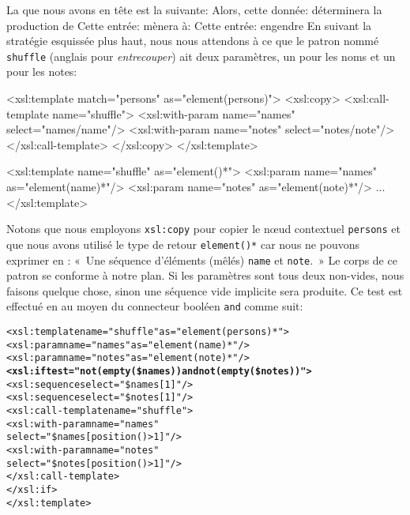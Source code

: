 La \DTD que nous avons en tête est la suivante:
\noindent Alors, cette donnée:
\noindent déterminera la production de
\noindent Cette entrée:
\noindent mènera à:
\noindent Cette entrée:
\noindent engendre
En suivant la stratégie esquissée plus haut, nous nous attendons à ce
que le patron nommé \texttt{shuffle} (anglais pour \emph{entrecouper})
ait deux paramètres, un pour les noms et un pour les notes:
\begin{sverb}
  <xsl:template match="persons" as="element(persons)">
    <xsl:copy>
      <xsl:call-template name="shuffle">
        <xsl:with-param name="names" select="names/name"/>
        <xsl:with-param name="notes" select="notes/note"/>
      </xsl:call-template>
    </xsl:copy>
  </xsl:template>

  <xsl:template name="shuffle" as="element()*">
    <xsl:param name="names" as="element(name)*"/>
    <xsl:param name="notes" as="element(note)*"/>
    ...
  </xsl:template>
\end{sverb}
Notons que nous employons \texttt{xsl:copy} pour copier le n{\oe}ud
contextuel \texttt{persons} et que nous avons utilisé le type de
retour \texttt{element()*} car nous ne pouvons exprimer en \XPath:
«~Une séquence d'éléments (mêlés) \texttt{name} et \texttt{note}.~» Le
corps de ce patron se conforme à notre plan. Si les paramètres sont
tous deux non-vides, nous faisons quelque chose, sinon une séquence
vide implicite sera produite. Ce test est effectué en \XPath au moyen
du connecteur booléen \texttt{and} comme suit:
\begin{alltt}
\small  <xsl:template name="shuffle" as="element(persons)*">
    <xsl:param name="names" as="element(name)*"/>
    <xsl:param name="notes" as="element(note)*"/>
    \textbf{<xsl:if test="not(empty(\$names)) and not(empty(\$notes))">}
      <xsl:sequence select="\$names[1]"/>
      <xsl:sequence select="\$notes[1]"/>
      <xsl:call-template name="shuffle">
        <xsl:with-param name="names"
                        select="\$names[position()>1]"/>
        <xsl:with-param name="notes"
                        select="\$notes[position()>1]"/>
      </xsl:call-template>
    </xsl:if>
  </xsl:template>
\end{alltt}

